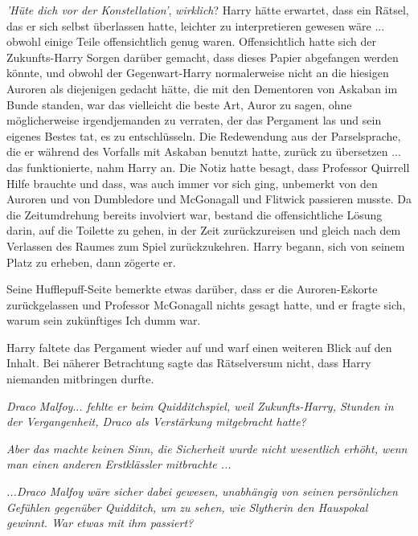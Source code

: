 \emph{'Hüte dich vor der Konstellation'}, \emph{wirklich}? Harry hätte erwartet,
dass ein Rätsel, das er sich selbst überlassen hatte, leichter zu interpretieren
gewesen wäre ... obwohl einige Teile offensichtlich genug waren. Offensichtlich
hatte sich der Zukunfts-Harry Sorgen darüber gemacht, dass dieses Papier
abgefangen werden könnte, und obwohl der Gegenwart-Harry normalerweise nicht an
die hiesigen Auroren als diejenigen gedacht hätte, die mit den Dementoren von
Askaban im Bunde standen, war das vielleicht die beste Art, \glqq{}Auror\grqq{}
zu sagen, ohne möglicherweise irgendjemanden zu verraten, der das Pergament las
und sein eigenes Bestes tat, es zu entschlüsseln. Die Redewendung aus der
Parselsprache, die er während des Vorfalls mit Askaban benutzt hatte, zurück zu
übersetzen ... das funktionierte, nahm Harry an. Die Notiz hatte besagt, dass
Professor Quirrell Hilfe brauchte und dass, was auch immer vor sich ging,
unbemerkt von den Auroren und von Dumbledore und McGonagall und Flitwick
passieren musste. Da die Zeitumdrehung bereits involviert war, bestand die
offensichtliche Lösung darin, auf die Toilette zu gehen, in der Zeit
zurückzureisen und gleich nach dem Verlassen des Raumes zum Spiel
zurückzukehren. Harry begann, sich von seinem Platz zu erheben, dann zögerte er.

Seine Hufflepuff-Seite bemerkte etwas darüber, dass er die Auroren-Eskorte
zurückgelassen und Professor McGonagall nichts gesagt hatte, und er fragte sich,
warum sein zukünftiges Ich dumm war.

Harry faltete das Pergament wieder auf und warf einen weiteren Blick auf den
Inhalt. Bei näherer Betrachtung sagte das Rätselversum nicht, dass Harry
niemanden mitbringen durfte.

\emph{Draco Malfoy}..\emph{. fehlte er beim Quidditchspiel, weil Zukunfts-Harry,
Stunden in der Vergangenheit, Draco als Verstärkung mitgebracht hatte?}

\emph{Aber das machte keinen Sinn, die Sicherheit wurde nicht wesentlich erhöht,
wenn man einen anderen Erstklässler mitbrachte ...}

\emph{...Draco Malfoy wäre sicher dabei gewesen, unabhängig von seinen
persönlichen Gefühlen gegenüber Quidditch, um zu sehen, wie Slytherin den
Hauspokal gewinnt. War etwas mit ihm passiert?}

